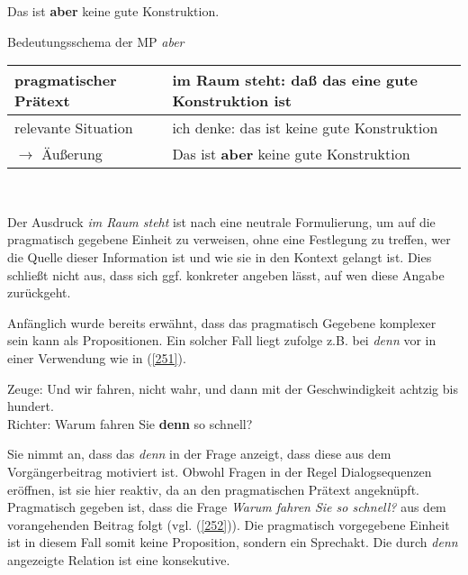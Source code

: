 \begin{exe}
	\ex\label{249} 
	Das ist \textbf{aber} keine gute Konstruktion.
\end{exe}
\vspace{-0.65cm}	
\begin{exe}
	\ex\label{250} Bedeutungsschema der MP \textit{aber}\\[-0.5em]
     \begin{tabular}[t]{|l|p{7cm}|}
     	\hline
      	pragmatischer Prätext & im Raum steht: daß das eine gute Konstruktion ist\\
        \hline
        relevante Situation & ich denke: das ist keine gute Konstruktion\\
        \hline
        $\rightarrow$ Äußerung & Das ist \textbf{aber} keine gute Konstruktion\\
        \hline
     \end{tabular}\\
     \hbox{}\hfill\hbox{\citet[84]{Diewald1998}}
\end{exe}
Der Ausdruck \textit{im Raum steht} ist nach \citet[85]{Diewald1998} eine neutrale Formulierung, um auf die pragmatisch gegebene Einheit zu verweisen, ohne eine Festlegung zu treffen, wer die Quelle dieser Information ist und wie sie in den Kontext gelangt ist. Dies schließt nicht aus, dass sich ggf. konkreter angeben lässt, auf wen diese Angabe zurückgeht.

Anfänglich wurde bereits erwähnt, dass das pragmatisch Gegebene komplexer sein kann als Propositionen. Ein solcher Fall liegt \citet[135]{Diewald2007} zufolge z.B. bei \textit{denn} vor in einer Verwendung wie in (\ref{251}).

\begin{exe}
	\ex\label{251} 
	Zeuge:	Und wir fahren, nicht wahr, und dann mit der Geschwindigkeit achtzig bis hundert.\\
	Richter: Warum fahren Sie \textbf{denn} so schnell?
    \hbox{}\hfill\hbox{\citet[61]{Hoffmann1994}}
\end{exe}
Sie nimmt an, dass das \textit{denn} in der Frage anzeigt, dass diese aus dem Vorgängerbeitrag motiviert ist. Obwohl Fragen in der Regel Dialogsequenzen eröffnen, ist sie hier reaktiv, da an den pragmatischen Prätext angeknüpft. Pragmatisch gegeben ist, dass die Frage \textit{Warum fahren Sie so schnell?} aus dem vorangehenden Beitrag folgt (vgl. (\ref{252})). Die pragmatisch vorgegebene Einheit ist in diesem Fall somit keine Proposition, sondern ein Sprechakt. Die durch \textit{denn} angezeigte Relation ist eine konsekutive.

